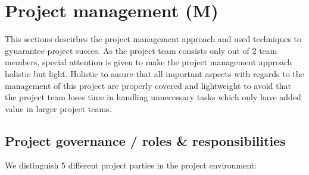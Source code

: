 \section{Project management (M)}
\label{sec:project-management}
This sections descirbes the project management approach and used techniques to gyuarantee project succes.
As the project team consists only out of 2 team members, special attention is given to make the project management approach holistic but light.
Holistic to assure that all important aspects with regards to the management of this project are properly covered and lightweight to avoid that the project team loses time in handling unnecessary tasks which only have added value in larger project teams.
\subsection{Project governance / roles \& responsibilities}
We distinguish 5 different project parties in the project environment:
